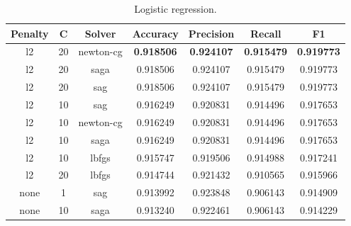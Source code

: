 \begin{appendices}
\begin{table}[ht]
\begin{subtable}{\textwidth}
\begin{adjustbox}{minipage=15cm, center}
\begin{tabular*}{\textwidth}{c @{\extracolsep{\fill}} cccccc}
\toprule
Penalty &   C &     Solver &  Accuracy &  Precision &    Recall &        F1 \\
\midrule
     l2 &  20 &  newton-cg &  \textbf{0.918506} &   \textbf{0.924107} &  \textbf{0.915479} &  \textbf{0.919773} \\
     l2 &  20 &       saga &  0.918506 &   0.924107 &  0.915479 &  0.919773 \\
     l2 &  20 &        sag &  0.918506 &   0.924107 &  0.915479 &  0.919773 \\
     l2 &  10 &        sag &  0.916249 &   0.920831 &  0.914496 &  0.917653 \\
     l2 &  10 &  newton-cg &  0.916249 &   0.920831 &  0.914496 &  0.917653 \\
     l2 &  10 &       saga &  0.916249 &   0.920831 &  0.914496 &  0.917653 \\
     l2 &  10 &      lbfgs &  0.915747 &   0.919506 &  0.914988 &  0.917241 \\
     l2 &  20 &      lbfgs &  0.914744 &   0.921432 &  0.910565 &  0.915966 \\
   none &   1 &        sag &  0.913992 &   0.923848 &  0.906143 &  0.914909 \\
   none &  10 &       saga &  0.913240 &   0.922461 &  0.906143 &  0.914229 \\
\bottomrule

\end{tabular*}
\caption{Logistic regression.}
\label{tab:Logistic regression}
\end{adjustbox}
\end{subtable}



\end{table}
\end{appendices}
